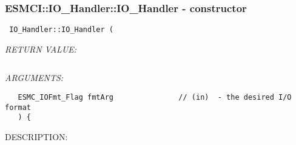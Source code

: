  
\setlength{\oldparskip}{\parskip}
\setlength{\parskip}{1.5ex}
\setlength{\oldparindent}{\parindent}
\setlength{\parindent}{0pt}
\setlength{\oldbaselineskip}{\baselineskip}
\setlength{\baselineskip}{11pt}
 
\def\bv{\begin{verbatim}}
\def\ev{\end{verbatim}}
\def\be{\begin{equation}}
\def\ee{\end{equation}}
\def\bea{\begin{eqnarray}}
\def\eea{\end{eqnarray}}
\def\bi{\begin{itemize}}
\def\ei{\end{itemize}}
\def\bn{\begin{enumerate}}
\def\en{\end{enumerate}}
\def\bd{\begin{description}}
\def\ed{\end{description}}
\def\({\left (}
\def\){\right )}
\def\[{\left [}
\def\]{\right ]}
\def\<{\left  \langle}
\def\>{\right \rangle}
\def\cI{{\cal I}}
\def\diag{\mathop{\rm diag}}
\def\tr{\mathop{\rm tr}}


 
\subsubsection [ESMCI::IO\_Handler::IO\_Handler] {ESMCI::IO\_Handler::IO\_Handler - constructor}


  
\begin{verbatim} IO_Handler::IO_Handler (\end{verbatim}{\em RETURN VALUE:}
\begin{verbatim}      \end{verbatim}{\em ARGUMENTS:}
\begin{verbatim}   ESMC_IOFmt_Flag fmtArg               // (in)  - the desired I/O format
   ) {\end{verbatim}
{\sf DESCRIPTION:\\ }


